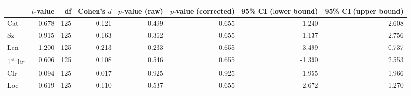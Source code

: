 \begin{tabular}{lrrrrrrr}
\toprule
{} & $t$-value &  df & Cohen's $d$ & $p$-value (raw) & $p$-value (corrected) & 95\% CI (lower bound) & 95\% CI (upper bound) \\
\midrule
Cat                       &     0.678 & 125 &       0.121 &           0.499 &                 0.655 &                -1.240 &                 2.608 \\
Sz                        &     0.915 & 125 &       0.163 &           0.362 &                 0.655 &                -1.137 &                 2.756 \\
Len                       &    -1.200 & 125 &      -0.213 &           0.233 &                 0.655 &                -3.499 &                 0.737 \\
1\textsuperscript{st} ltr &     0.606 & 125 &       0.108 &           0.546 &                 0.655 &                -1.390 &                 2.553 \\
Clr                       &     0.094 & 125 &       0.017 &           0.925 &                 0.925 &                -1.955 &                 1.966 \\
Loc                       &    -0.619 & 125 &      -0.110 &           0.537 &                 0.655 &                -2.672 &                 1.270 \\
\bottomrule
\end{tabular}
